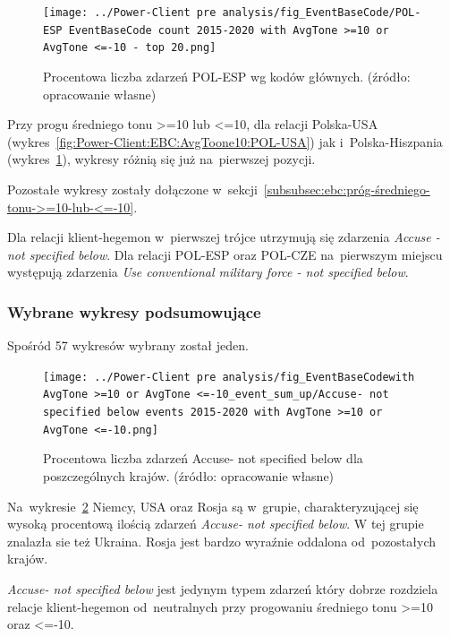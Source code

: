 \documentclass[11pt]{report}
\begin{document}
    \begin{figure}[tp]
        \centering
        \texttt{[image: ../Power-Client pre analysis/fig\_EventBaseCode/POL-ESP EventBaseCode count 2015-2020 with AvgTone >=10 or AvgTone <=-10 - top 20.png]}
        \caption{Procentowa liczba zdarzeń POL-ESP wg kodów głównych. (źródło: opracowanie własne)}
        \label{fig:Power-Client:EBC:AvgToone10:POL-ESP}
    \end{figure}

    Przy progu średniego tonu >=10 lub <=10, dla relacji Polska-USA (wykres~\ref{fig:Power-Client:EBC:AvgToone10:POL-USA}) jak i~Polska-Hiszpania (wykres~\ref{fig:Power-Client:EBC:AvgToone10:POL-ESP}),
    wykresy różnią się już na~pierwszej pozycji.

    Pozostałe wykresy zostały dołączone w~sekcji~\ref{subsubsec:ebc:próg-średniego-tonu->=10-lub-<=-10}.

    Dla relacji klient-hegemon w~pierwszej trójce utrzymują się zdarzenia \textit{Accuse - not specified below}.
    Dla relacji POL-ESP oraz POL-CZE na~pierwszym miejscu występują zdarzenia \textit{Use conventional military force - not specified below}.

    \subsubsection{Wybrane wykresy podsumowujące}
    Spośród 57 wykresów wybrany został jeden.

    \begin{figure}[tp]
        \centering
        \texttt{[image: ../Power-Client pre analysis/fig\_EventBaseCodewith AvgTone >=10 or AvgTone <=-10\_event\_sum\_up/Accuse- not specified below events 2015-2020 with AvgTone >=10 or AvgTone <=-10.png]}
        \caption{Procentowa liczba zdarzeń Accuse- not specified below dla poszczególnych krajów. (źródło: opracowanie własne)}
        \label{fig:Power-Client:ERC:Mentions:SumUp:Accuse- not specified below}
    \end{figure}

    Na~wykresie~\ref{fig:Power-Client:ERC:Mentions:SumUp:Accuse- not specified below} Niemcy, USA oraz Rosja są w~grupie,
    charakteryzującej się wysoką procentową ilością zdarzeń \textit{Accuse- not specified below}.
    W tej grupie znalazła sie też Ukraina.
    Rosja jest bardzo wyraźnie oddalona od~pozostałych krajów.

    \textit{Accuse- not specified below} jest jedynym typem zdarzeń który dobrze rozdziela relacje klient-hegemon od~neutralnych
    przy progowaniu średniego tonu >=10 oraz <=-10.
\end{document}
